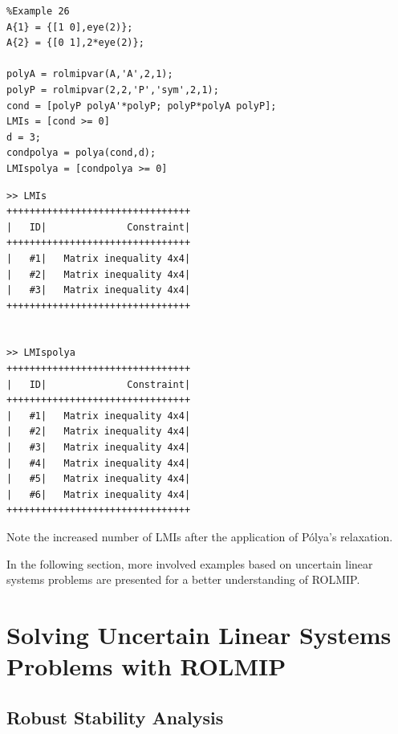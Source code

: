 \documentclass[english,11pt]{article}
\theoremstyle{break} \theorembodyfont{\small\rm}
\begin{document}
\begin{minipage}{11.5cm}
 \begin{lstlisting}
%Example 26
A{1} = {[1 0],eye(2)};
A{2} = {[0 1],2*eye(2)};

polyA = rolmipvar(A,'A',2,1);
polyP = rolmipvar(2,2,'P','sym',2,1);
cond = [polyP polyA'*polyP; polyP*polyA polyP];
LMIs = [cond >= 0]
d = 3;
condpolya = polya(cond,d);
LMIspolya = [condpolya >= 0]
 \end{lstlisting}
\end{minipage}
\vspace{0.2cm}

\begin{minipage}{9.2cm}
\begin{lstlisting}[rulecolor=\color{red}]
>> LMIs
++++++++++++++++++++++++++++++++
|   ID|              Constraint|
++++++++++++++++++++++++++++++++
|   #1|   Matrix inequality 4x4|
|   #2|   Matrix inequality 4x4|
|   #3|   Matrix inequality 4x4|
++++++++++++++++++++++++++++++++


>> LMIspolya
++++++++++++++++++++++++++++++++
|   ID|              Constraint|
++++++++++++++++++++++++++++++++
|   #1|   Matrix inequality 4x4|
|   #2|   Matrix inequality 4x4|
|   #3|   Matrix inequality 4x4|
|   #4|   Matrix inequality 4x4|
|   #5|   Matrix inequality 4x4|
|   #6|   Matrix inequality 4x4|
++++++++++++++++++++++++++++++++
\end{lstlisting}
\end{minipage}
\vspace{0.2cm}
\vspace{0.2cm}

Note the increased number of LMIs after the application of P\'{o}lya's relaxation.

%

In the following section, more involved examples based on uncertain linear systems problems are presented for a better understanding of ROLMIP.

\section{Solving Uncertain Linear Systems Problems with ROLMIP}

\subsection{Robust Stability Analysis}
\end{document}
